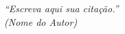 \begin{epigrafe}
    \vspace*{\fill}
\begin{flushright}


\textit{``Escreva aqui sua citação.'' \\
(Nome do Autor)}
\end{flushright}
\end{epigrafe}
